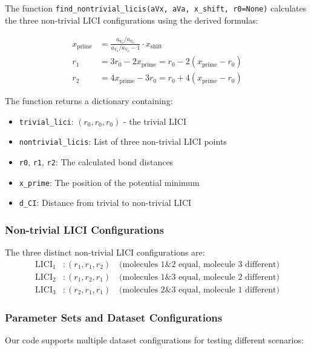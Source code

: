 \documentclass{article}
\begin{document}
The function \texttt{find\_nontrivial\_licis(aVx, aVa, x\_shift, r0=None)} calculates the three non-trivial LICI configurations using the derived formulas:

\begin{align}
x_{\text{prime}} &= \frac{a_{V_a}/a_{V_x}}{a_{V_a}/a_{V_x} - 1} \cdot x_{\text{shift}} \\
r_1 &= 3r_0 - 2x_{\text{prime}} = r_0 - 2(x_{\text{prime}} - r_0) \\
r_2 &= 4x_{\text{prime}} - 3r_0 = r_0 + 4(x_{\text{prime}} - r_0)
\end{align}

The function returns a dictionary containing:
\begin{itemize}
    \item \texttt{trivial\_lici}: $(r_0, r_0, r_0)$ - the trivial LICI
    \item \texttt{nontrivial\_licis}: List of three non-trivial LICI points
    \item \texttt{r0}, \texttt{r1}, \texttt{r2}: The calculated bond distances
    \item \texttt{x\_prime}: The position of the potential minimum
    \item \texttt{d\_CI}: Distance from trivial to non-trivial LICI
\end{itemize}

\subsubsection{Non-trivial LICI Configurations}

The three distinct non-trivial LICI configurations are:
\begin{align}
\text{LICI}_1 &: (r_1, r_1, r_2) \quad \text{(molecules 1\&2 equal, molecule 3 different)} \\
\text{LICI}_2 &: (r_1, r_2, r_1) \quad \text{(molecules 1\&3 equal, molecule 2 different)} \\
\text{LICI}_3 &: (r_2, r_1, r_1) \quad \text{(molecules 2\&3 equal, molecule 1 different)}
\end{align}

\subsubsection{Parameter Sets and Dataset Configurations}

Our code supports multiple dataset configurations for testing different scenarios:
\end{document}
